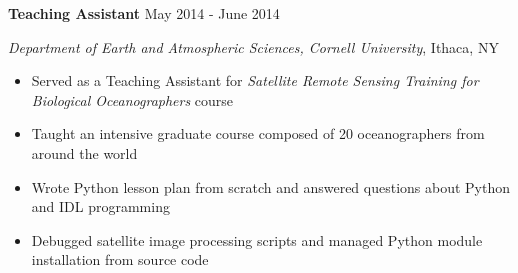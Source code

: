 
\textbf{Teaching Assistant} \hfill May 2014 - June 2014

\textit{Department of Earth and Atmospheric Sciences, Cornell University}, Ithaca, NY

\begin{itemize}
    \item Served as a Teaching Assistant for \textit{Satellite Remote Sensing Training for Biological Oceanographers} course
    \item Taught an intensive graduate course composed of 20 oceanographers from around the world
    \item Wrote Python lesson plan from scratch and answered questions about Python and IDL programming
    \item Debugged satellite image processing scripts and managed Python module installation from source code
\end{itemize}
